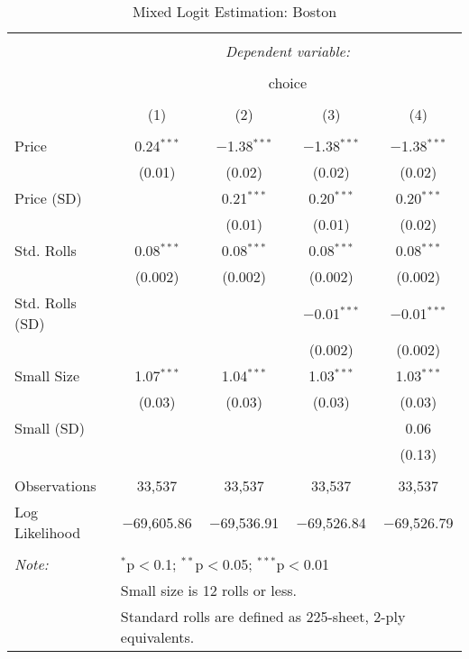 
\begin{table}[!htbp] \centering 
  \caption{Mixed Logit Estimation: Boston} 
  \label{tab:mnlBostonRandCoefNoObsHet} 
\begin{tabular}{@{\extracolsep{5pt}}lcccc} 
\\[-1.8ex]\hline 
\hline \\[-1.8ex] 
 & \multicolumn{4}{c}{\textit{Dependent variable:}} \\ 
\cline{2-5} 
\\[-1.8ex] & \multicolumn{4}{c}{choice} \\ 
\\[-1.8ex] & (1) & (2) & (3) & (4)\\ 
\hline \\[-1.8ex] 
 Price & 0.24$^{***}$ & $-$1.38$^{***}$ & $-$1.38$^{***}$ & $-$1.38$^{***}$ \\ 
  & (0.01) & (0.02) & (0.02) & (0.02) \\ 
  Price (SD) &  & 0.21$^{***}$ & 0.20$^{***}$ & 0.20$^{***}$ \\ 
  &  & (0.01) & (0.01) & (0.02) \\ 
  Std. Rolls & 0.08$^{***}$ & 0.08$^{***}$ & 0.08$^{***}$ & 0.08$^{***}$ \\ 
  & (0.002) & (0.002) & (0.002) & (0.002) \\ 
  Std. Rolls (SD) &  &  & $-$0.01$^{***}$ & $-$0.01$^{***}$ \\ 
  &  &  & (0.002) & (0.002) \\ 
  Small Size & 1.07$^{***}$ & 1.04$^{***}$ & 1.03$^{***}$ & 1.03$^{***}$ \\ 
  & (0.03) & (0.03) & (0.03) & (0.03) \\ 
  Small (SD) &  &  &  & 0.06 \\ 
  &  &  &  & (0.13) \\ 
 \hline \\[-1.8ex] 
Observations & 33,537 & 33,537 & 33,537 & 33,537 \\ 
Log Likelihood & $-$69,605.86 & $-$69,536.91 & $-$69,526.84 & $-$69,526.79 \\ 
\hline 
\hline \\[-1.8ex] 
\textit{Note:}  & \multicolumn{4}{l}{$^{*}$p$<$0.1; $^{**}$p$<$0.05; $^{***}$p$<$0.01} \\ 
 & \multicolumn{4}{l}{Small size is 12 rolls or less.} \\ 
 & \multicolumn{4}{l}{Standard rolls are defined as 225-sheet, 2-ply equivalents.} \\ 
\end{tabular} 
\end{table} 
